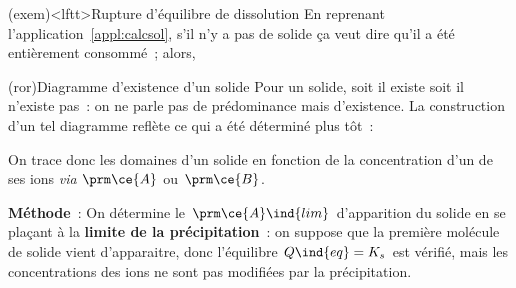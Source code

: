 \documentclass[../../main/main.tex]{subfiles}
\begin{document}
\begin{tcb*}(exem)<lftt>{Rupture d'équilibre de dissolution}
	En reprenant l'application~\ref{appl:calcsol}, s'il n'y a pas de solide ça
	veut dire qu'il a été entièrement consommé~; alors,
	\vspace{-15pt}
\end{tcb*}

\begin{tcb*}(ror){Diagramme d'existence d'un solide}
	Pour un solide, soit il existe soit il n'existe pas~: on ne parle pas de
	prédominance mais d'existence. La construction d'un tel diagramme reflète ce
	qui a été déterminé plus tôt~:
	\begin{center}
		\textbf{}
	\end{center}
	On trace donc les domaines d'un solide  en fonction de la
	concentration d'un de ses ions \textit{via} $\prm \ce{A}$ ou $\prm \ce{B}$.
	\begin{center}
	\end{center}
	\textbf{Méthode}~:
	On détermine le $\prm \ce{A}\ind{lim}$ d’apparition du solide en se plaçant à
	la \textbf{limite de la précipitation}~: on suppose que la première molécule
	de solide vient d’apparaitre, donc l’équilibre $Q\ind{eq} = K_s$ est vérifié,
	mais les concentrations des ions ne sont pas modifiées par la précipitation.
\end{tcb*}
\end{document}
